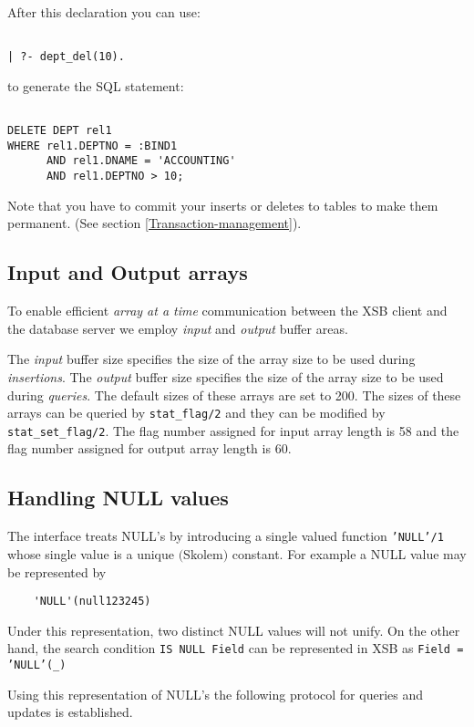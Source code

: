 After this declaration you can use:
\begin{verbatim}

| ?- dept_del(10).
\end{verbatim}

to generate the SQL statement:
\begin{verbatim}

DELETE DEPT rel1 
WHERE rel1.DEPTNO = :BIND1 
      AND rel1.DNAME = 'ACCOUNTING'
      AND rel1.DEPTNO > 10;
\end{verbatim}


Note that you have to commit your inserts or deletes to tables to make
them permanent.  (See section \ref{Transaction-management}).

\subsection{Input and Output arrays}\label{Array-sizes}

To enable efficient {\it array at a time} communication between the XSB client
and the database server we employ {\it input} and  {\it output} buffer areas.

The {\it input} buffer size specifies the size of the array size to be used
during {\it insertions}. The {\it output} buffer size specifies the size of the
array size to be used during {\it queries}. The default sizes of these arrays
are set to 200. The sizes of these arrays can be queried by {\tt stat\_flag/2}
and they can be modified by {\tt stat\_set\_flag/2}. The flag number assigned
for input array length is 58 and  the flag number assigned for output array 
length is 60.

\subsection{Handling NULL values}\label{NULL-values}


The interface treats NULL's by introducing a single valued function
{\tt 'NULL'/1} whose single value is a unique $($Skolem$)$ constant.
For example a NULL value may be represented by 
\begin{verbatim}
	'NULL'(null123245) 
\end{verbatim} 
Under this representation, two distinct NULL values will not unify.
On the other hand, the search condition {\tt IS NULL Field} can be
represented in XSB as {\tt Field = 'NULL'(\_)}

Using this representation of NULL's the following protocol for queries
and updates is established.

